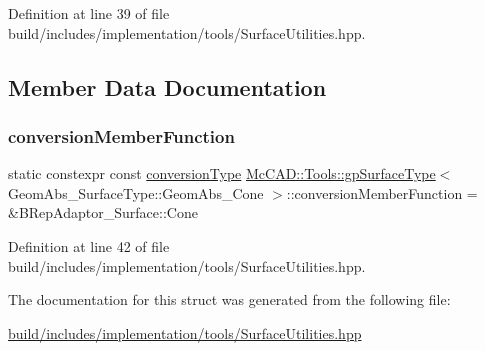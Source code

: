Definition at line 39 of file build/includes/implementation/tools/\+Surface\+Utilities.\+hpp.



\subsection{Member Data Documentation}
\mbox{\label{structMcCAD_1_1Tools_1_1gpSurfaceType_3_01GeomAbs__SurfaceType_1_1GeomAbs__Cone_01_4_adcb370b376ee5075c5cdbc3cf9179ad8}} 
\subsubsection{\texorpdfstring{conversion\+Member\+Function}{conversionMemberFunction}}
{\footnotesize\ttfamily static constexpr const \hyperlink{structMcCAD_1_1Tools_1_1gpSurfaceType_3_01GeomAbs__SurfaceType_1_1GeomAbs__Cone_01_4_ac8a1ab6a2261261ea3b9d10002f0f89d}{conversion\+Type} \hyperlink{structMcCAD_1_1Tools_1_1gpSurfaceType}{Mc\+C\+A\+D\+::\+Tools\+::gp\+Surface\+Type}$<$ Geom\+Abs\+\_\+\+Surface\+Type\+::\+Geom\+Abs\+\_\+\+Cone $>$\+::conversion\+Member\+Function = \&B\+Rep\+Adaptor\+\_\+\+Surface\+::\+Cone\hspace{0.3cm}{\ttfamily [static]}}



Definition at line 42 of file build/includes/implementation/tools/\+Surface\+Utilities.\+hpp.



The documentation for this struct was generated from the following file\+:\begin{DoxyCompactItemize}
\item 
\hyperlink{build_2includes_2implementation_2tools_2SurfaceUtilities_8hpp}{build/includes/implementation/tools/\+Surface\+Utilities.\+hpp}\end{DoxyCompactItemize}
